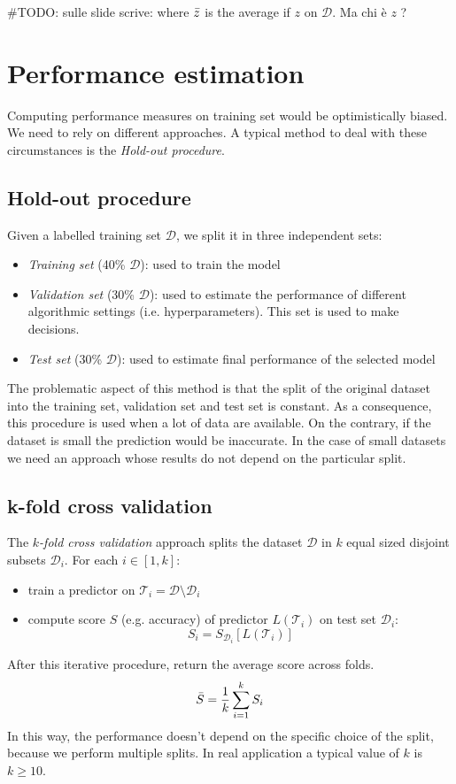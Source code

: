 \#TODO: sulle slide scrive: where $\Bar{z}$ is the average if $z$ on $\mathcal{D}$. Ma chi è $z$ ?

\section{Performance estimation}
Computing performance measures on training set would be optimistically biased. We need to rely on different approaches. A typical method to deal with these circumstances is the \textit{Hold-out procedure}.

\subsection{Hold-out procedure}
Given a labelled training set $\mathcal{D}$, we split it in three independent sets:
\begin{itemize}
    \item \textit{Training set} (40\% $\mathcal{D}$): used to train the model
    \item \textit{Validation set} (30\% $\mathcal{D}$): used to estimate the performance of different algorithmic settings (i.e. hyperparameters). This set is used to make decisions.
    \item \textit{Test set} (30\% $\mathcal{D}$): used to estimate final performance of the selected model
\end{itemize}

The problematic aspect of this method is that the split of the original dataset into the training set, validation set and test set is constant. As a consequence, this procedure is used when a lot of data are available. On the contrary, if the dataset is small the prediction would be inaccurate. In the case of small datasets we need an approach whose results do not depend on the particular split.

\subsection{k-fold cross validation}
The \textit{$k$-fold cross validation} approach splits the dataset $\mathcal{D}$ in $k$ equal sized disjoint subsets $\mathcal{D}_i$. For each $i \in [1,k]$:
\begin{itemize}
    \item train a predictor on $\mathcal{T}_i = \mathcal{D} \setminus \mathcal{D}_i$
    \item compute score $S$ (e.g. accuracy) of predictor $L(\mathcal{T}_i)$ on test set $\mathcal{D}_i$:
    $$S_i = S_{\mathcal{D}_i}[L(\mathcal{T}_i)]$$
\end{itemize}
After this iterative procedure, return the average score across folds.
$$\Bar{S} = \frac{1}{k} \sum_{i=1}^k S_i$$
In this way, the performance doesn't depend on the specific choice of the split, because we perform multiple splits. In real application a typical value of $k$ is $k \geq 10$. \newline

